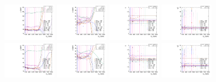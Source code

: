 \begin{figure}[htbp]
  \centering
  \includegraphics[width=0.2\textwidth]{fig/analysis/paramSignalShape_allSig_MJJ_HP_bb_DEtaHi_mean.pdf}
  \includegraphics[width=0.2\textwidth]{fig/analysis/paramSignalShape_allSig_MJJ_HP_bb_DEtaHi_sigma.pdf}
  \includegraphics[width=0.2\textwidth]{fig/analysis/paramSignalShape_allSig_MJJ_HP_bb_DEtaHi_alpha.pdf}
  \includegraphics[width=0.2\textwidth]{fig/analysis/paramSignalShape_allSig_MJJ_HP_bb_DEtaHi_alpha2.pdf}\\
  \includegraphics[width=0.2\textwidth]{fig/analysis/paramSignalShape_allSig_MJJ_LP_bb_DEtaHi_mean.pdf}
  \includegraphics[width=0.2\textwidth]{fig/analysis/paramSignalShape_allSig_MJJ_LP_bb_DEtaHi_sigma.pdf}
  \includegraphics[width=0.2\textwidth]{fig/analysis/paramSignalShape_allSig_MJJ_LP_bb_DEtaHi_alpha.pdf}
  \includegraphics[width=0.2\textwidth]{fig/analysis/paramSignalShape_allSig_MJJ_LP_bb_DEtaHi_alpha2.pdf}\\

\end{figure}
